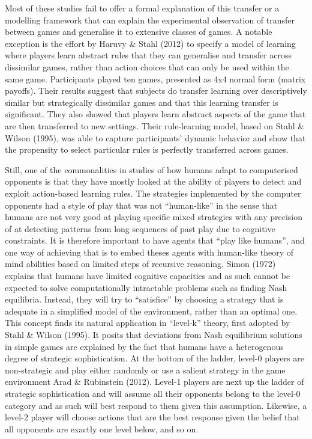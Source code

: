 \documentclass[man,floatsintext]{apa6}
\begin{document}
Most of these studies fail to offer a formal explanation of this transfer or a modelling framework that can explain the experimental observation of transfer between games and generalise it to extensive classes of games. A notable exception is the effort by Haruvy \& Stahl (2012) to specify a model of learning where players learn abstract rules that they can generalise and transfer across dissimilar games, rather than action choices that can only be used within the same game. Participants played ten games, presented as 4x4 normal form (matrix payoffs). Their results suggest that subjects do transfer learning over descriptively similar but strategically dissimilar games and that this learning transfer is significant. They also showed that players learn abstract aspects of the game that are then transferred to new settings. Their rule-learning model, based on Stahl \& Wilson (1995), was able to capture participants' dynamic behavior and show that the propensity to select particular rules is perfectly transferred across games.

Still, one of the commonalities in studies of how humans adapt to computerised opponents is that they have mostly looked at the ability of players to detect and exploit action-based learning rules. The strategies implemented by the computer opponents had a style of play that was not \enquote{human-like} in the sense that humans are not very good at playing specific mixed strategies with any precision of at detecting patterns from long sequences of past play due to cognitive constraints. It is therefore important to have agents that \enquote{play like humans}, and one way of achieving that is to embed theses agents with human-like theory of mind abilities based on limited steps of recursive reasoning. Simon (1972) explains that humans have limited cognitive capacities and as such cannot be expected to solve computationally intractable problems such as finding Nash equilibria. Instead, they will try to \enquote{satisfice} by choosing a strategy that is adequate in a simplified model of the environment, rather than an optimal one. This concept finds its natural application in \enquote{level-k} theory, first adopted by Stahl \& Wilson (1995). It posits that deviations from Nash equilibrium solutions in simple games are explained by the fact that humans have a heterogenous degree of strategic sophistication. At the bottom of the ladder, level-0 players are non-strategic and play either randomly or use a salient strategy in the game environment Arad \& Rubinstein (2012). Level-1 players are next up the ladder of strategic sophistication and will assume all their opponents belong to the level-0 category and as such will best respond to them given this assumption. Likewise, a level-2 player will choose actions that are the best response given the belief that all opponents are exactly one level below, and so on.
\end{document}
